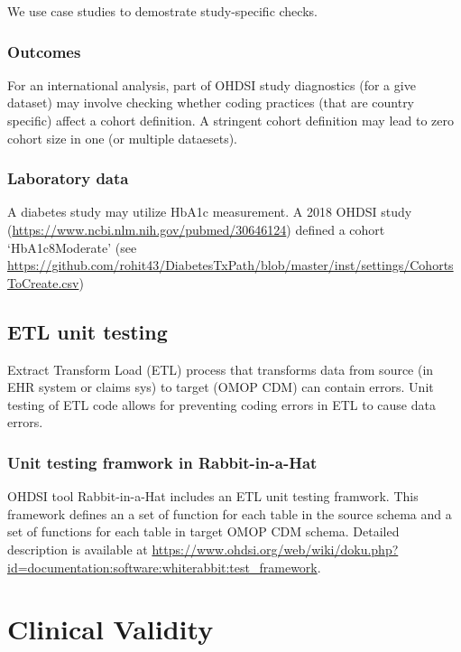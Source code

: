 \documentclass[11pt]{book}
\theoremstyle{definition}
\theoremstyle{definition}
\theoremstyle{definition}
\theoremstyle{remark}
\begin{document}
We use case studies to demostrate study-specific checks.

\hypertarget{outcomes}{%
\subsection{Outcomes}\label{outcomes}}

For an international analysis, part of OHDSI study diagnostics (for a give dataset) may involve checking whether coding practices (that are country specific) affect a cohort definition. A stringent cohort definition may lead to zero cohort size in one (or multiple dataesets).

\hypertarget{laboratory-data}{%
\subsection{Laboratory data}\label{laboratory-data}}

A diabetes study may utilize HbA1c measurement. A 2018 OHDSI study (\url{https://www.ncbi.nlm.nih.gov/pubmed/30646124}) defined a cohort `HbA1c8Moderate' (see \url{https://github.com/rohit43/DiabetesTxPath/blob/master/inst/settings/CohortsToCreate.csv})

\hypertarget{etl-unit-testing}{%
\section{ETL unit testing}\label{etl-unit-testing}}

Extract Transform Load (ETL) process that transforms data from source (in EHR system or claims sys) to target (OMOP CDM) can contain errors. Unit testing of ETL code allows for preventing coding errors in ETL to cause data errors.

\hypertarget{unit-testing-framwork-in-rabbit-in-a-hat}{%
\subsection{Unit testing framwork in Rabbit-in-a-Hat}\label{unit-testing-framwork-in-rabbit-in-a-hat}}

OHDSI tool Rabbit-in-a-Hat includes an ETL unit testing framwork. This framework defines an a set of function for each table in the source schema and a set of functions for each table in target OMOP CDM schema. Detailed description is available at \url{https://www.ohdsi.org/web/wiki/doku.php?id=documentation:software:whiterabbit:test_framework}.

\hypertarget{ClinicalValidity}{%
\chapter{Clinical Validity}\label{ClinicalValidity}}
\end{document}
